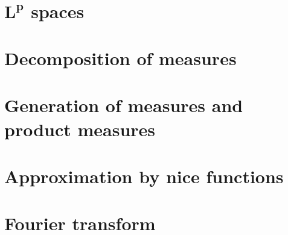 \documentclass{beamer}
\numberwithin{equation}{section}
\begin{document}
\begin{frame}\frametitle{{\normalsize \secname} \\ {\large \subsecname}}
\end{frame}

\begin{frame}\frametitle{{\normalsize \secname} \\ {\large \subsecname}}
\end{frame}

\begin{frame}\frametitle{{\normalsize \secname} \\ {\large \subsecname}}
\end{frame}


\section{$\mathbf{L^p}$ spaces}



\section{Decomposition of measures}



\section{Generation of measures and product measures}



\section{Approximation by nice functions}



\section{Fourier transform}
\end{document}
